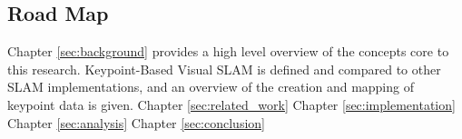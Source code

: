 \subsection{Road Map}

Chapter \ref{sec:background} provides a high level overview of the concepts core to this research. Keypoint-Based Visual SLAM is defined and compared to other SLAM implementations, and an overview of the creation and mapping of keypoint data is given. 
Chapter \ref{sec:related_work}
Chapter \ref{sec:implementation}
Chapter \ref{sec:analysis}
Chapter \ref{sec:conclusion}